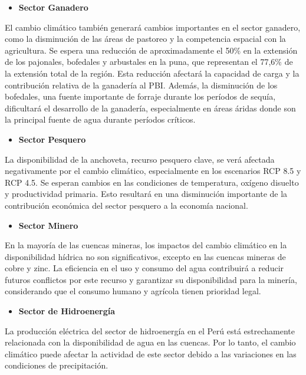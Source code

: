 \documentclass[
  a4paper,
]{article}
\providecommand{\tightlist}{%
  \setlength{\itemsep}{0pt}\setlength{\parskip}{0pt}}\usepackage{longtable,booktabs,array}
\begin{document}
\begin{itemize}
\tightlist
\item
  \textbf{Sector Ganadero}
\end{itemize}

El cambio climático también generará cambios importantes en el sector
ganadero, como la disminución de las áreas de pastoreo y la competencia
espacial con la agricultura. Se espera una reducción de aproximadamente
el 50\% en la extensión de los pajonales, bofedales y arbustales en la
puna, que representan el 77,6\% de la extensión total de la región. Esta
reducción afectará la capacidad de carga y la contribución relativa de
la ganadería al PBI. Además, la disminución de los bofedales, una fuente
importante de forraje durante los períodos de sequía, dificultará el
desarrollo de la ganadería, especialmente en áreas áridas donde son la
principal fuente de agua durante períodos críticos.

\begin{itemize}
\tightlist
\item
  \textbf{Sector Pesquero}
\end{itemize}

La disponibilidad de la anchoveta, recurso pesquero clave, se verá
afectada negativamente por el cambio climático, especialmente en los
escenarios RCP 8.5 y RCP 4.5. Se esperan cambios en las condiciones de
temperatura, oxígeno disuelto y productividad primaria. Esto resultará
en una disminución importante de la contribución económica del sector
pesquero a la economía nacional.

\begin{itemize}
\tightlist
\item
  \textbf{Sector Minero}
\end{itemize}

En la mayoría de las cuencas mineras, los impactos del cambio climático
en la disponibilidad hídrica no son significativos, excepto en las
cuencas mineras de cobre y zinc. La eficiencia en el uso y consumo del
agua contribuirá a reducir futuros conflictos por este recurso y
garantizar su disponibilidad para la minería, considerando que el
consumo humano y agrícola tienen prioridad legal.

\begin{itemize}
\tightlist
\item
  \textbf{Sector de Hidroenergía}
\end{itemize}

La producción eléctrica del sector de hidroenergía en el Perú está
estrechamente relacionada con la disponibilidad de agua en las cuencas.
Por lo tanto, el cambio climático puede afectar la actividad de este
sector debido a las variaciones en las condiciones de precipitación.
\end{document}
